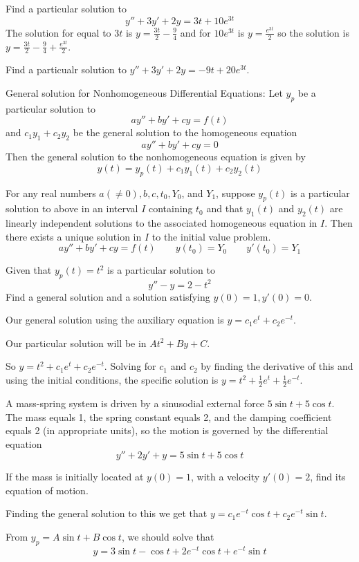 \documentclass[../diffeq.tex]{subfiles}
\begin{document}
\begin{example}
    Find a particular solution to 
    \[ y''+3y'+2y = 3t+10e^{3t}\]
    The solution for equal to $3t$ is $y=\frac{3t}{2}-\frac{9}{4}$ and for $10e^{3t}$ is $y=\frac{e^{3t}}{2}$ so the solution is $y=\frac{3t}{2}-\frac{9}{4}+\frac{e^{3t}}{2}$.
\end{example}

\ex Find a particualr solution to $y''+3y'+2y=-9t+20e^{3t}$.

General solution for Nonhomogeneous Differential Equations: Let $y_p$ be a particular solution to 
\[ ay''+by'+cy = f(t) \]
and $c_1y_1+c_2y_2$ be the general solution to the homogeneous equation 
\[ ay''+by'+cy =0 \]
Then the general solution to the nonhomogeneous equation is given by 
\[ y(t)=y_p(t)+c_1y_1(t)+c_2y_2(t) \]

\begin{theorem}
    For any real numbers $a(\neq 0), b, c, t_0, Y_0$, and $Y_1$, suppose $y_p(t)$ is a particular solution to above in an interval $I$ containing $t_0$ and 
    that $y_1(t)$ and $y_2(t)$ are linearly independent solutions to the associated homogeneous equation in $I$. Then there exists a unique solution in $I$ to the initial value problem.
    \[ ay''+by'+cy = f(t) \qquad y(t_0)=Y_0 \qquad y'(t_0)= Y_1 \]
\end{theorem}

\begin{example}
    Given that $y_p(t)=t^2$ is a particular solution to 
    \[ y''-y=2-t^2 \]
    Find a general solution and a solution satisfying $y(0)=1, y'(0)=0$.

    Our general solution using the auxiliary equation is $y=c_1e^t+c_2e^{-t}$.

    Our particular solution will be in $At^2+By+C$.

    So $y=t^2+c_1e^t+c_2e^{-t}$. Solving for $c_1$ and $c_2$ by finding the derivative of this and using the initial conditions, the specific solution is $y=t^2+\frac{1}{2}e^t+\frac{1}{2}e^{-t}$.
\end{example}

\begin{example}
    A mass-spring system is driven by a sinusodial external force $5\sin t + 5\cos t$. The mass equals 1, the spring constant equals 2, and the damping coefficient equals 2 (in appropriate units), so the motion is governed by the differential equation 
    \[ y''+2y'+y=5\sin t+5\cos t \]

    If the mass is initially located at $y(0)=1$, with a velocity $y'(0)=2$, find its equation of motion.

    Finding the general solution to this we get that $y=c_1e^{-t}\cos t + c_2e^{-t}\sin t$. 
    
    From $y_p=A\sin t + B\cos t$, we should solve that 
    \[y=3\sin t - \cos t + 2e^{-t}\cos t + e^{-t}\sin t\]
\end{example}
\end{document}
